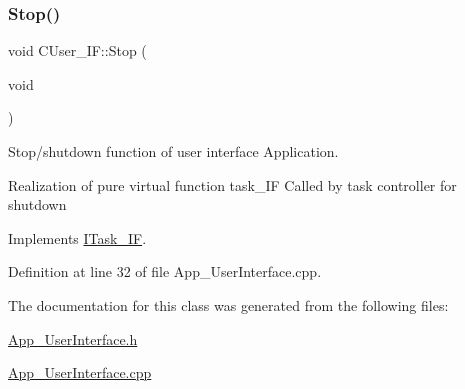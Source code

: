 \subsubsection{\texorpdfstring{Stop()}{Stop()}}
{\footnotesize\ttfamily void C\+User\+\_\+\+I\+F\+::\+Stop (\begin{DoxyParamCaption}\item[{void}]{ }\end{DoxyParamCaption})\hspace{0.3cm}{\ttfamily [virtual]}}



Stop/shutdown function of user interface Application. 

Realization of pure virtual function task\+\_\+\+IF Called by task controller for shutdown 

Implements \mbox{\hyperlink{class_i_task___i_f_af5f8fba86704c7e36d0e4681d58300c6}{I\+Task\+\_\+\+IF}}.



Definition at line 32 of file App\+\_\+\+User\+Interface.\+cpp.



The documentation for this class was generated from the following files\+:\begin{DoxyCompactItemize}
\item 
\mbox{\hyperlink{_app___user_interface_8h}{App\+\_\+\+User\+Interface.\+h}}\item 
\mbox{\hyperlink{_app___user_interface_8cpp}{App\+\_\+\+User\+Interface.\+cpp}}\end{DoxyCompactItemize}
